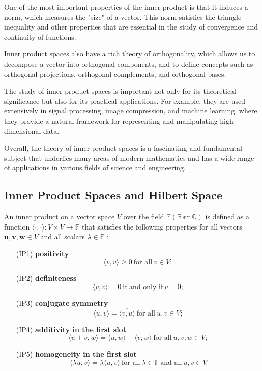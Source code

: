 \documentclass[12pt, a4paper]{article} %
\begin{document}
One of the most important properties of the inner product is that it induces a norm, which measures the "size" of a vector. This norm satisfies the triangle inequality and other properties that are essential in the study of convergence and continuity of functions.

Inner product spaces also have a rich theory of orthogonality, which allows us to decompose a vector into orthogonal components, and to define concepts such as orthogonal projections, orthogonal complements, and orthogonal bases.

The study of inner product spaces is important not only for its theoretical significance but also for its practical applications. For example, they are used extensively in signal processing, image compression, and machine learning, where they provide a natural framework for representing and manipulating high-dimensional data.

Overall, the theory of inner product spaces is a fascinating and fundamental subject that underlies many areas of modern mathematics and has a wide range of applications in various fields of science and engineering.

\subsection{Inner Product Spaces and Hilbert Space}

An inner product on a vector space $V$ over the field $\mathbb{F(R\  \mbox{or}\ C)}$ is defined as a function $\langle \cdot, \cdot \rangle : V \times V \to \mathbb{F}$ that satisfies the following properties for all vectors $\mathbf{u}, \mathbf{v}, \mathbf{w} \in V$ and all scalars $\lambda \in \mathbb{F}$ :

\begin{enumerate}
    \item [(IP1)] {\bf positivity} \[\langle v,v\rangle \geq 0\ \mbox{for all}\ v\in V ;\]
    \item [(IP2)]{\bf definiteness} \[\langle v,v \rangle = 0\ \mbox{if and only if}\ v=0 ;\]
    \item [(IP3)] {\bf conjugate symmetry} \[\langle u, v\rangle = \overline{\langle v, u \rangle}\ \mbox{for all}\ u,v\in V ;\]
    \item [(IP4)] {\bf additivity in the first slot} \[\langle u + v, w\rangle = \langle u, w \rangle + \langle v, w \rangle\ \mbox{for all}\ u,v,w \in V ;\]
    \item [(IP5)] {\bf homogeneity in the first slot} \[\langle \lambda u, v \rangle = \lambda \langle u,v \rangle\ \mbox{for all}\ \lambda \in \mathbb{F}\ \mbox{and all}\ u,v \in V\]
\end{enumerate}
\end{document}
